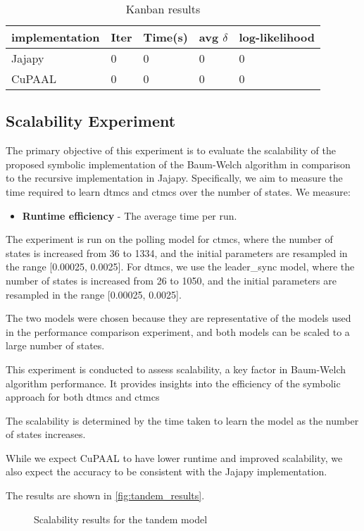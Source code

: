 \begin{table}[!htb]
    \centering
    \caption{Kanban results}
    \label{tab:kanban_results}
    \begin{tabular}{lllll}
        \toprule
        implementation & Iter & Time(s) & avg $\delta$ & log-likelihood \\
        \midrule
        Jajapy         & 0    & 0       & 0            & 0              \\
        CuPAAL         & 0    & 0       & 0            & 0              \\
        \bottomrule
    \end{tabular}
\end{table}


\subsection{Scalability Experiment}
The primary objective of this experiment is to evaluate the scalability of the proposed symbolic implementation of the Baum-Welch algorithm in comparison to the recursive implementation in Jajapy. Specifically, we aim to measure the time required to learn \glspl{dtmc} and \glspl{ctmc} over the number of states.
We measure:
\begin{itemize}
    \item \textbf{Runtime efficiency} - The average time per run.
\end{itemize}

The experiment is run on the polling model for \glspl{ctmc}, where the number of states is increased from 36 to 1334, and the initial parameters are resampled in the range [0.00025, 0.0025].
For \glspl{dtmc}, we use the leader\_sync model, where the number of states is increased from 26 to 1050, and the initial parameters are resampled in the range [0.00025, 0.0025].

The two models were chosen because they are representative of the models used in the performance comparison experiment, and both models can be scaled to a large number of states.

This experiment is conducted to assess scalability, a key factor in Baum-Welch algorithm performance. It provides insights into the efficiency of the symbolic approach for both \glspl{dtmc} and \glspl{ctmc}

The scalability is determined by the time taken to learn the model as the number of states increases.

While we expect CuPAAL to have lower runtime and improved scalability, we also expect the accuracy to be consistent with the Jajapy implementation.

The results are shown in \autoref{fig:tandem_results}.

\begin{figure}
    \centering
    \caption{Scalability results for the tandem model}
    \label{fig:tandem_results}
\end{figure}